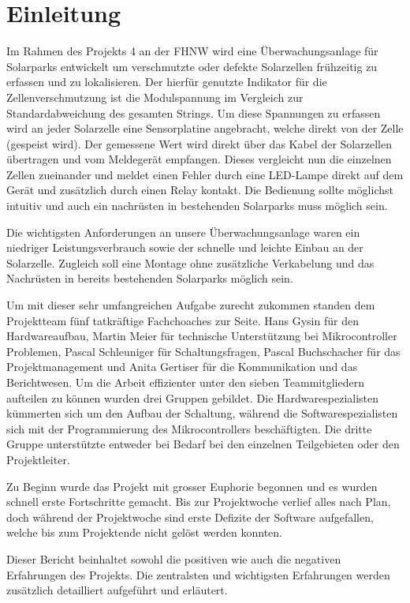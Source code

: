 \section{Einleitung}


Im Rahmen des Projekts 4 an der FHNW wird eine Überwachungsanlage für Solarparks entwickelt um verschmutzte oder defekte Solarzellen frühzeitig zu erfassen und zu lokalisieren. Der hierfür genutzte Indikator für die Zellenverschmutzung ist die Modulspannung im Vergleich zur Standardabweichung des gesamten Strings. Um diese Spannungen zu erfassen wird an jeder Solarzelle eine Sensorplatine angebracht, welche direkt von der Zelle (gespeist wird). Der gemessene Wert wird direkt über das Kabel der Solarzellen übertragen und vom Meldegerät empfangen. Dieses vergleicht nun die einzelnen Zellen zueinander und meldet einen Fehler durch eine LED-Lampe direkt auf dem Gerät und zusätzlich durch einen Relay kontakt. Die Bedienung sollte möglichst intuitiv und auch ein nachrüsten in bestehenden Solarparks muss möglich sein.

Die wichtigsten Anforderungen an unsere Überwachungsanlage waren ein niedriger Leistungsverbrauch sowie der schnelle und leichte Einbau an der Solarzelle. Zugleich soll eine Montage ohne zusätzliche Verkabelung und das Nachrüsten in bereits bestehenden Solarparks möglich sein.
 
Um mit dieser sehr umfangreichen Aufgabe zurecht zukommen standen dem Projektteam fünf tatkräftige Fachchoaches zur Seite. Hans Gysin für den Hardwareaufbau, Martin Meier für technische Unterstützung bei Mikrocontroller Problemen, Pascal Schleuniger für Schaltungsfragen, Pascal Buchschacher für das Projektmanagement und Anita Gertiser für die Kommunikation und das Berichtwesen. Um die Arbeit effizienter unter den sieben Teammitgliedern aufteilen zu können wurden drei Gruppen gebildet. Die Hardwarespezialisten kümmerten sich um den Aufbau der Schaltung, während die Softwarespezialisten sich mit der Programmierung des Mikrocontrollers beschäftigten. Die dritte Gruppe unterstützte entweder bei Bedarf bei den einzelnen Teilgebieten oder den Projektleiter.

Zu Beginn wurde das Projekt mit grosser Euphorie begonnen und es wurden schnell erste Fortschritte gemacht. Bis zur Projektwoche verlief alles nach Plan, doch während der Projektwoche sind erste Defizite der Software aufgefallen, welche bis zum Projektende nicht gelöst werden konnten. 

Dieser Bericht beinhaltet sowohl die positiven wie auch die negativen Erfahrungen des Projekts. Die zentralsten und wichtigsten Erfahrungen werden zusätzlich detailliert aufgeführt und erläutert.
